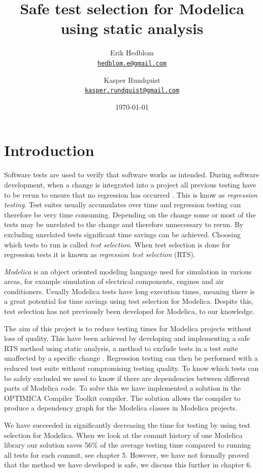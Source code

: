 \documentclass{cslthse-msc}
\author{
	Erik Hedblom \\
	{\normalsize \href{mailto:hedblom.e@gmail.com}{\texttt{hedblom.e@gmail.com}}}
	\and
	Kasper Rundquist \\
	{\normalsize \href{mailto:kasper.rundquist@gmail.com}{\texttt{kasper.rundquist@gmail.com}}}
}
\title{Safe test selection for Modelica using static analysis}
\date{\today}
\begin{document}
\makefrontmatter
\chapter[Introduction]{Introduction}
Software tests are used to verify that software works as intended.
During software development, when a change is integrated into a project all previous testing have to be rerun to ensure that no regression has occurred \cite{DBLP:conf/sigsoft/LegunsenHSLZM16, haider2016safe}. This is know as \emph{regression testing}. Test suites usually accumulates over time and regression testing can therefore be very time consuming. Depending on the change some or most of the tests may be unrelated to the change and therefore unnecessary to rerun. By excluding unrelated tests significant time savings can be achieved. Choosing which tests to run is called \emph{test selection}. When test selection is done for regression tests it is known as \emph{regression test selection} (RTS).

\emph{Modelica} is an object oriented modeling language used for simulation in various areas, for example simulation of electrical components, engines and air conditioners. Usually Modelica tests have long execution times, meaning there is a great potential for time savings using test selection for Modelica. Despite this, test selection has not previously been developed for Modelica, to our knowledge.

The aim of this project is to reduce testing times for Modelica projects without loss of quality. This have been achieved by developing and implementing a safe RTS method using static analysis, a method to exclude tests in a test suite unaffected by a specific change \cite{DBLP:conf/pppj/OqvistHM16}. Regression testing can then be performed with a reduced test suite without compromising testing quality. To know which tests can be safely excluded we need to know if there are dependencies between different parts of Modelica code. To solve this we have implemented a solution in the OPTIMICA Compiler Toolkit compiler. The solution allows the compiler to produce a dependency graph for the Modelica classes in Modelica projects.

We have succeeded in significantly decreasing the time for testing by using test selection for Modelica. When we look at the commit history of one Modelica library our solution saves 56\% of the average testing time compared to running all tests for each commit, see chapter 5. However, we have not formally proved that the method we have developed is safe, we discuss this further in chapter 6.
\end{document}
